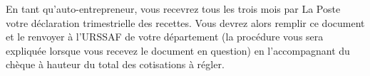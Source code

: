 ﻿En tant qu'auto-entrepreneur, vous recevrez tous les trois mois par La Poste votre déclaration trimestrielle des recettes. Vous devrez alors remplir ce document et le renvoyer à l'URSSAF de votre département (la procédure vous sera expliquée lorsque vous recevez le document en question) en l'accompagnant du chèque à hauteur du total des cotisations à régler.